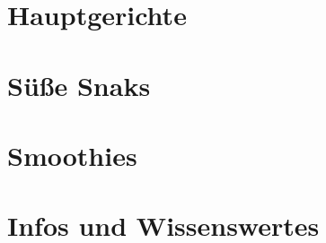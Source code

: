 \documentclass[a4paper]{scrartcl}
\begin{document}


\section{Hauptgerichte} %











\section{Süße Snaks} %






\section{Smoothies} %


\section{Infos und Wissenswertes} %
	

\end{document}
